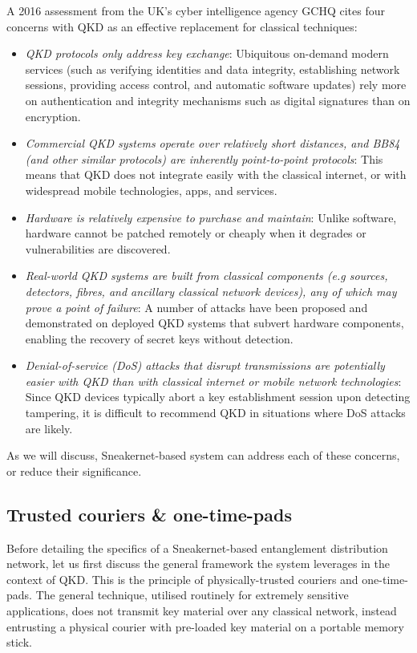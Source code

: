\documentclass[twocolumn, aps, rmp, amsmath, amssymb, nofootinbib, superscriptaddress, longbibliography, floatfix, table-of-contents, eqsecnum]{revtex4-2}
\begin{document}
A 2016 assessment from the UK's cyber intelligence agency GCHQ cites four concerns with QKD as an effective replacement for classical techniques:
\begin{itemize}
\item \textit{QKD protocols only address key exchange}: Ubiquitous on-demand modern services (such as verifying identities and data integrity, establishing network sessions, providing access control, and automatic software updates) rely more on authentication and integrity mechanisms such as digital signatures than on encryption.
\item \textit{Commercial QKD systems operate over relatively short distances, and BB84 (and other similar protocols) are inherently point-to-point protocols}: This means that QKD does not integrate easily with the classical internet, or with widespread mobile technologies, apps, and services.
\item \textit{Hardware is relatively expensive to purchase and maintain}: Unlike software, hardware cannot be patched remotely or cheaply when it degrades or vulnerabilities are discovered.
\item \textit{Real-world QKD systems are built from classical components (e.g sources, detectors, fibres, and ancillary classical network devices), any of which may prove a point of failure}: A number of attacks have been proposed and demonstrated on deployed QKD systems that subvert hardware components, enabling the recovery of secret keys without detection.
\item \textit{Denial-of-service (DoS) attacks that disrupt transmissions are potentially easier with QKD than with classical internet or mobile network technologies}: Since QKD devices typically abort a key establishment session upon detecting tampering, it is difficult to recommend QKD in situations where DoS attacks are likely.
\end{itemize}

As we will discuss, Sneakernet-based system can address each of these concerns, or reduce their significance.

\subsection{Trusted couriers \& one-time-pads}

Before detailing the specifics of a Sneakernet-based entanglement distribution network, let us first discuss the general framework the system leverages in the context of QKD. This is the principle of physically-trusted couriers and one-time-pads. The general technique, utilised routinely for extremely sensitive applications, does not transmit key material over any classical network, instead entrusting a physical courier with pre-loaded key material on a portable memory stick. 
\end{document}
